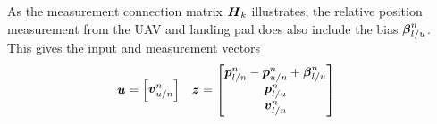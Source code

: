 As the measurement connection matrix $\boldsymbol{H}_k$ illustrates, the relative position measurement from the UAV and landing pad does also include the bias $\boldsymbol{\beta}^n_{l/u}$. This gives the input and measurement vectors
\begin{align}
    \boldsymbol{u}&=
    \begin{bmatrix}
        \boldsymbol{v}^n_{u/n}    
    \end{bmatrix}
    &
    \boldsymbol{z}&=
    \begin{bmatrix}
        \boldsymbol{p}^n_{l/n}-\boldsymbol{p}^n_{u/n}+\boldsymbol{\beta}^n_{l/u}\\
        \boldsymbol{p}^n_{l/u}\\
        \boldsymbol{v}^n_{l/n}
    \end{bmatrix}
\end{align}


